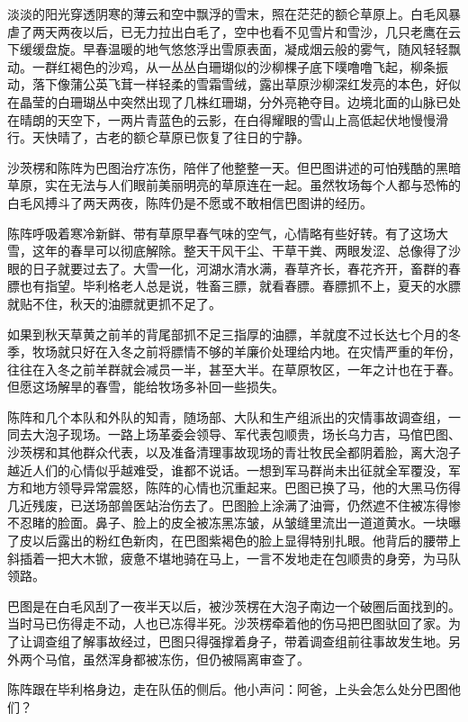 \par 淡淡的阳光穿透阴寒的薄云和空中飘浮的雪末，照在茫茫的额仑草原上。白毛风暴虐了两天两夜以后，已无力拉出白毛了，空中也看不见雪片和雪沙，几只老鹰在云下缓缓盘旋。早春温暖的地气悠悠浮出雪原表面，凝成烟云般的雾气，随风轻轻飘动。一群红褐色的沙鸡，从一丛丛白珊瑚似的沙柳棵子底下噗噜噜飞起，柳条振动，落下像蒲公英飞茸一样轻柔的雪霜雪绒，露出草原沙柳深红发亮的本色，好似在晶莹的白珊瑚丛中突然出现了几株红珊瑚，分外亮艳夺目。边境北面的山脉已处在晴朗的天空下，一两片青蓝色的云影，在白得耀眼的雪山上高低起伏地慢慢滑行。天快晴了，古老的额仑草原已恢复了往日的宁静。
\par 沙茨楞和陈阵为巴图治疗冻伤，陪伴了他整整一天。但巴图讲述的可怕残酷的黑暗草原，实在无法与人们眼前美丽明亮的草原连在一起。虽然牧场每个人都与恐怖的白毛风搏斗了两天两夜，陈阵仍是不愿或不敢相信巴图讲的经历。
\par 陈阵呼吸着寒冷新鲜、带有草原早春气味的空气，心情略有些好转。有了这场大雪，这年的春旱可以彻底解除。整天干风干尘、干草干粪、两眼发涩、总像得了沙眼的日子就要过去了。大雪一化，河湖水清水满，春草齐长，春花齐开，畜群的春膘也有指望。毕利格老人总是说，牲畜三膘，就看春膘。春膘抓不上，夏天的水膘就贴不住，秋天的油膘就更抓不足了。
\par 如果到秋天草黄之前羊的背尾部抓不足三指厚的油膘，羊就度不过长达七个月的冬季，牧场就只好在入冬之前将膘情不够的羊廉价处理给内地。在灾情严重的年份，往往在入冬之前羊群就会减员一半，甚至大半。在草原牧区，一年之计也在于春。但愿这场解旱的春雪，能给牧场多补回一些损失。
\par 陈阵和几个本队和外队的知青，随场部、大队和生产组派出的灾情事故调查组，一同去大泡子现场。一路上场革委会领导、军代表包顺贵，场长乌力吉，马倌巴图、沙茨楞和其他群众代表，以及准备清理事故现场的青壮牧民全都阴着脸，离大泡子越近人们的心情似乎越难受，谁都不说话。一想到军马群尚未出征就全军覆没，军方和地方领导异常震怒，陈阵的心情也沉重起来。巴图已换了马，他的大黑马伤得几近残废，已送场部兽医站治伤去了。巴图脸上涂满了油膏，仍然遮不住被冻得惨不忍睹的脸面。鼻子、脸上的皮全被冻黑冻皱，从皱缝里流出一道道黄水。一块曝了皮以后露出的粉红色新肉，在巴图紫褐色的脸上显得特别扎眼。他背后的腰带上斜插着一把大木锨，疲惫不堪地骑在马上，一言不发地走在包顺贵的身旁，为马队领路。
\par 巴图是在白毛风刮了一夜半天以后，被沙茨楞在大泡子南边一个破圈后面找到的。当时马已伤得走不动，人也已冻得半死。沙茨楞牵着他的伤马把巴图驮回了家。为了让调查组了解事故经过，巴图只得强撑着身子，带着调查组前往事故发生地。另外两个马倌，虽然浑身都被冻伤，但仍被隔离审查了。
\par 陈阵跟在毕利格身边，走在队伍的侧后。他小声问：阿爸，上头会怎么处分巴图他们？
